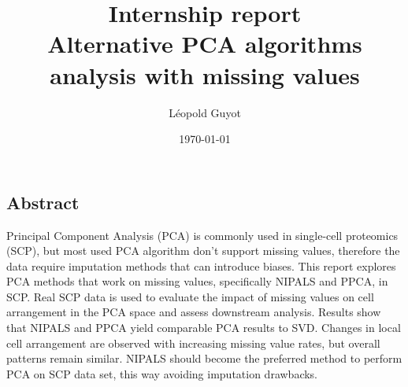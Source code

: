 \documentclass[a4paper, 11pt, twocolumn]{article}
\title{\Large Internship report \\
\huge Alternative PCA algorithms analysis with missing values}
\author{Léopold Guyot}
\date{\today}
\begin{document}
\pagestyle{fancy}
\setlength{\headheight}{25.0117pt}
\fancyhead{}\fancyfoot{}
\fancyfoot[R]{\thepage}

\onecolumn
\maketitle

\begin{tcolorbox}[breakable,colback=white,colframe=black,width=\dimexpr\textwidth+12mm\relax,enlarge left by=-6mm]

\section*{Abstract}
Principal Component Analysis (PCA) is commonly used in single-cell proteomics (SCP), but most used PCA algorithm don't support missing values, therefore the data require imputation methods that can introduce biases. This report explores PCA methods that work on missing values, specifically NIPALS and PPCA, in SCP. Real SCP data is used to evaluate the impact of missing values on cell arrangement in the PCA space and assess downstream analysis. Results show that NIPALS and PPCA yield comparable PCA results to SVD. Changes in local cell arrangement are observed with increasing missing value rates, but overall patterns remain similar. NIPALS should become the preferred method to perform PCA on SCP data set, this way avoiding imputation drawbacks.

\end{tcolorbox}
\end{document}
